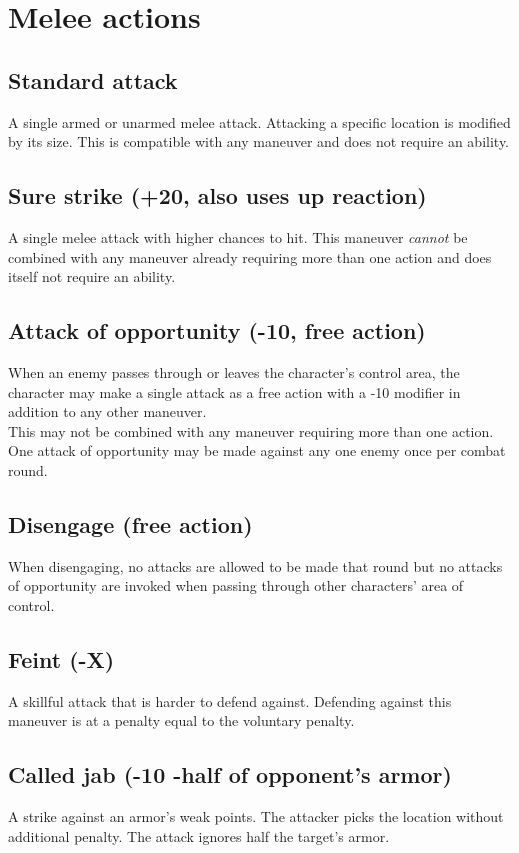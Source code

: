 \section{Melee actions}
\subsection*{Standard attack}
A single armed or unarmed melee attack. Attacking a specific location is modified by its size. This is compatible with any maneuver and does not require an ability.
\subsection*{Sure strike (+20, also uses up reaction)}
A single melee attack with higher chances to hit. This maneuver \emph{cannot} be combined with any maneuver already requiring more than one action and does itself not require an ability.
\subsection*{Attack of opportunity (-10, free action)}
When an enemy passes through or leaves the character’s control area, the character may make a single attack as a free action with a -10 modifier in addition to any other maneuver.\\
This may not be combined with any maneuver requiring more than one action.\\
One attack of opportunity may be made against any one enemy once per combat round.
\subsection*{Disengage (free action)}
\label{action:disengage}
When disengaging, no attacks are allowed to be made that round but no attacks of opportunity are invoked when passing through other characters' area of control.
\subsection*{Feint (-X)}
A skillful attack that is harder to defend against. Defending against this maneuver is at a penalty equal to the voluntary penalty.
\subsection*{Called jab (-10 -half of opponent’s armor)}
A strike against an armor’s weak points. The attacker picks the location without additional penalty. The attack ignores half the target’s armor.
